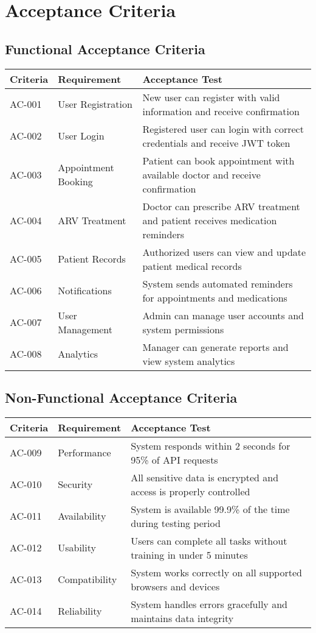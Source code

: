 \documentclass[12pt,a4paper]{article}
\begin{document}
\section{Acceptance Criteria}

\subsection{Functional Acceptance Criteria}

\begin{longtable}{|p{2cm}|p{3cm}|p{9cm}|}
\hline
\textbf{Criteria} & \textbf{Requirement} & \textbf{Acceptance Test} \\
\hline
AC-001 & User Registration & New user can register with valid information and receive confirmation \\
\hline
AC-002 & User Login & Registered user can login with correct credentials and receive JWT token \\
\hline
AC-003 & Appointment Booking & Patient can book appointment with available doctor and receive confirmation \\
\hline
AC-004 & ARV Treatment & Doctor can prescribe ARV treatment and patient receives medication reminders \\
\hline
AC-005 & Patient Records & Authorized users can view and update patient medical records \\
\hline
AC-006 & Notifications & System sends automated reminders for appointments and medications \\
\hline
AC-007 & User Management & Admin can manage user accounts and system permissions \\
\hline
AC-008 & Analytics & Manager can generate reports and view system analytics \\
\hline
\end{longtable}

\subsection{Non-Functional Acceptance Criteria}

\begin{longtable}{|p{2cm}|p{3cm}|p{9cm}|}
\hline
\textbf{Criteria} & \textbf{Requirement} & \textbf{Acceptance Test} \\
\hline
AC-009 & Performance & System responds within 2 seconds for 95\% of API requests \\
\hline
AC-010 & Security & All sensitive data is encrypted and access is properly controlled \\
\hline
AC-011 & Availability & System is available 99.9\% of the time during testing period \\
\hline
AC-012 & Usability & Users can complete all tasks without training in under 5 minutes \\
\hline
AC-013 & Compatibility & System works correctly on all supported browsers and devices \\
\hline
AC-014 & Reliability & System handles errors gracefully and maintains data integrity \\
\hline
\end{longtable}
\end{document}
